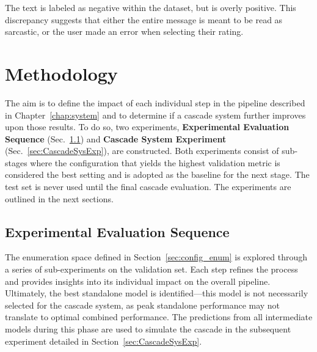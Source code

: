 \documentclass[a4paper,twoside,12pt]{book}
\begin{document}
The text is labeled as negative within the dataset, but is overly positive. This discrepancy suggests that either the entire message is meant to be read as sarcastic, or the user made an error when selecting their rating.

\section{Methodology} \label{sec:methodology}

The aim is to define the impact of each individual step in the pipeline described in Chapter~\ref{chap:system} and to determine if a cascade system further improves upon those results. To do so, two experiments, \textbf{Experimental Evaluation Sequence} (Sec.~\ref{sec:ExperimentalEvalSeq}) and \textbf{Cascade System Experiment} (Sec.~\ref{sec:CascadeSysExp}), are constructed. Both experiments consist of sub-stages where the configuration that yields the highest validation metric is considered the best setting and is adopted as the baseline for the next stage. The test set is never used until the final cascade evaluation. The experiments are outlined in the next sections.

\subsection{Experimental Evaluation Sequence} \label{sec:ExperimentalEvalSeq}

The enumeration space defined in Section~\ref{sec:config_enum} is explored through a series of sub-experiments on the validation set. Each step refines the process and provides insights into its individual impact on the overall pipeline. Ultimately, the best standalone model is identified---this model is not necessarily selected for the cascade system, as peak standalone performance may not translate to optimal combined performance. The predictions from all intermediate models during this phase are used to simulate the cascade in the subsequent experiment detailed in Section~\ref{sec:CascadeSysExp}.
\end{document}
